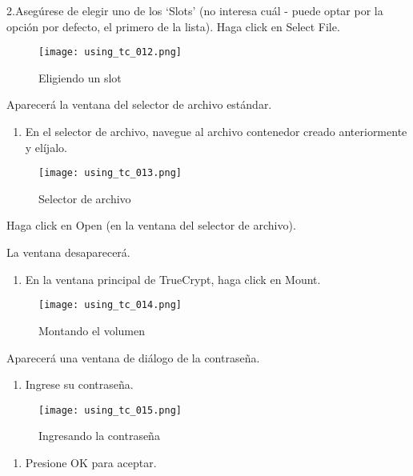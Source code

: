 \documentclass[10pt,a5paper,twoside,,]{book}
\providecommand{\tightlist}{%
  \setlength{\itemsep}{0pt}\setlength{\parskip}{0pt}}
\begin{document}
2.Asegúrese de elegir uno de los `Slots' (no interesa cuál - puede optar
por la opción por defecto, el primero de la lista). Haga click en Select
File.

\begin{figure}[htbp]
\centering
\texttt{[image: using\_tc\_012.png]}
\caption{Eligiendo un slot}
\end{figure}

Aparecerá la ventana del selector de archivo estándar.

\begin{enumerate}
\def\labelenumi{\arabic{enumi}.}
\setcounter{enumi}{2}
\tightlist
\item
  En el selector de archivo, navegue al archivo contenedor creado
  anteriormente y elíjalo.
\end{enumerate}

\begin{figure}[htbp]
\centering
\texttt{[image: using\_tc\_013.png]}
\caption{Selector de archivo}
\end{figure}

Haga click en Open (en la ventana del selector de archivo).

La ventana desaparecerá.

\begin{enumerate}
\def\labelenumi{\arabic{enumi}.}
\setcounter{enumi}{3}
\tightlist
\item
  En la ventana principal de TrueCrypt, haga click en Mount.
\end{enumerate}

\begin{figure}[htbp]
\centering
\texttt{[image: using\_tc\_014.png]}
\caption{Montando el volumen}
\end{figure}

Aparecerá una ventana de diálogo de la contraseña.

\begin{enumerate}
\def\labelenumi{\arabic{enumi}.}
\setcounter{enumi}{4}
\tightlist
\item
  Ingrese su contraseña.
\end{enumerate}

\begin{figure}[htbp]
\centering
\texttt{[image: using\_tc\_015.png]}
\caption{Ingresando la contraseña}
\end{figure}

\begin{enumerate}
\def\labelenumi{\arabic{enumi}.}
\setcounter{enumi}{5}
\tightlist
\item
  Presione OK para aceptar.
\end{enumerate}
\end{document}
